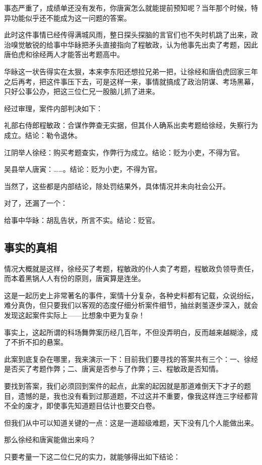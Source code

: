 \begin{multicols}{\theparacolNo}
事态严重了，成绩单还没有发布，你唐寅怎么就能提前预知呢？当年那个时候，特异功能似乎还不能成为这一问题的答案。

此时这件事情已经传得满城风雨，整日探头探脑的言官们也不失时机跳了出来，政治嗅觉敏锐的给事中华眿把矛头直接指向了程敏政，认为他事先出卖了考题，因此唐伯虎和徐经两人才能答出考题高中。

华眿这一状告得实在太狠，本来李东阳还想拉兄弟一把，让徐经和唐伯虎回家三年之后再考，把这件事压下去，可是这样一来，事情就搞成了政治阴谋、考场黑幕，只好公事公办，把这三位仁兄一股脑儿抓了进来。

经过审理，案件内部判决如下：

礼部右侍郎程敏政：合谋作弊查无实据，但其仆人确系出卖考题给徐经，失察行为成立。结论：勒令退休。

江阴举人徐经：购买考题查实，作弊行为成立。结论：贬为小吏，不得为官。

吴县举人唐寅：……。结论：贬为小吏，不得为官。

当然了，这些都是内部结论，除处罚结果外，具体情况并未向社会公开。

对了，还漏了一个：

给事中华眿：胡乱告状，所言不实。结论：贬官。

\subsection{事实的真相}
情况大概就是这样，徐经买了考题，程敏政的仆人卖了考题，程敏政负领导责任，而本着黑锅人人有份的原则，唐寅算是连坐。

这是一起历史上非常著名的事件，案情十分复杂，各种史料都有记载，众说纷纭，难分真伪，但只要我们以客观的态度仔细分析案件细节，抽丝剥茧逐步深入，就会发现这起案件实际上——比想象中更为复杂！

事实上，这起所谓的科场舞弊案历经几百年，不但没弄明白，反而越来越糊涂，成了不折不扣的悬案。

此案到底复杂在哪里，我来演示一下：目前我们要寻找的答案共有三个：一、徐经是否买了考题作弊；二、唐寅是否参与了作弊；三、程敏政是否知情。

要找到答案，我们必须回到案件的起点，此案的起因就是那道难倒天下才子的题目，遗憾的是，我也没有看到过那道题，不过这并不重要，像我这样连三字经都背不全的废才，即使事先知道题目估计也要交白卷。

但我们从中可以知道关键的一点：这是一道超级难题，天下没有几个人能做出来。

那么徐经和唐寅能做出来吗？

只要考量一下这二位仁兄的实力，就能够得出如下结论：


\end{multicols}
